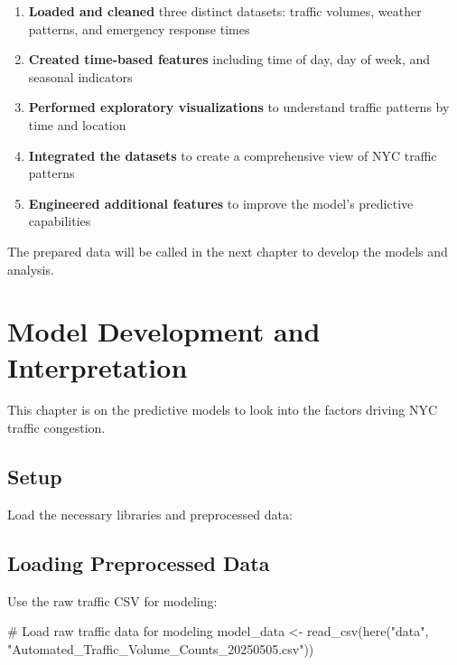 \documentclass[
  letterpaper,
  DIV=11,
  numbers=noendperiod]{scrreprt}
\newenvironment{Shaded}{\begin{snugshade}}{\end{snugshade}}
\newcommand{\CommentTok}[1]{\textcolor[rgb]{0.37,0.37,0.37}{#1}}
\newcommand{\FunctionTok}[1]{\textcolor[rgb]{0.28,0.35,0.67}{#1}}
\newcommand{\NormalTok}[1]{\textcolor[rgb]{0.00,0.23,0.31}{#1}}
\newcommand{\OtherTok}[1]{\textcolor[rgb]{0.00,0.23,0.31}{#1}}
\newcommand{\StringTok}[1]{\textcolor[rgb]{0.13,0.47,0.30}{#1}}
\providecommand{\tightlist}{%
  \setlength{\itemsep}{0pt}\setlength{\parskip}{0pt}}\usepackage{longtable,booktabs,array}
\begin{document}
\begin{enumerate}
\def\labelenumi{\arabic{enumi}.}
\tightlist
\item
  \textbf{Loaded and cleaned} three distinct datasets: traffic volumes,
  weather patterns, and emergency response times
\item
  \textbf{Created time-based features} including time of day, day of
  week, and seasonal indicators
\item
  \textbf{Performed exploratory visualizations} to understand traffic
  patterns by time and location
\item
  \textbf{Integrated the datasets} to create a comprehensive view of NYC
  traffic patterns
\item
  \textbf{Engineered additional features} to improve the model's
  predictive capabilities
\end{enumerate}

The prepared data will be called in the next chapter to develop the
models and analysis.


\chapter{Model Development and
Interpretation}\label{model-development-and-interpretation}

This chapter is on the predictive models to look into the factors
driving NYC traffic congestion.

\section{Setup}\label{setup}

Load the necessary libraries and preprocessed data:

\section{Loading Preprocessed Data}\label{loading-preprocessed-data}

Use the raw traffic CSV for modeling:

\begin{Shaded}
\begin{Highlighting}[]
\CommentTok{\# Load raw traffic data for modeling}
\NormalTok{model\_data }\OtherTok{\textless{}{-}} \FunctionTok{read\_csv}\NormalTok{(}\FunctionTok{here}\NormalTok{(}\StringTok{"data"}\NormalTok{, }\StringTok{"Automated\_Traffic\_Volume\_Counts\_20250505.csv"}\NormalTok{))}
\end{Highlighting}
\end{Shaded}
\end{document}
